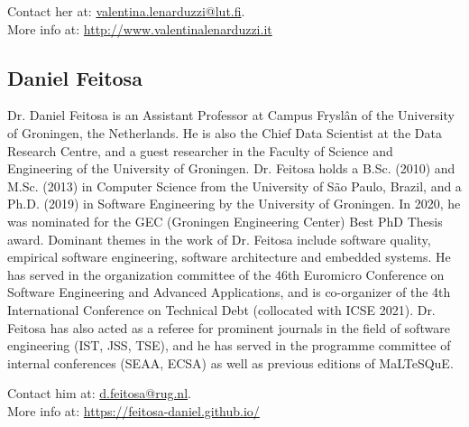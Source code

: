 \medskip
\noindent 
Contact her at: \href{mailto:valentina.lenarduzzi@lut.fi}{valentina.lenarduzzi@lut.fi}.\\
More info at: \url{http://www.valentinalenarduzzi.it}

\subsection{Daniel Feitosa}
Dr. Daniel Feitosa is an Assistant Professor at Campus Fryslân of the University of Groningen, the Netherlands. He is also the Chief Data Scientist at the Data Research Centre, and a guest researcher in the Faculty of Science and Engineering of the University of Groningen. 
Dr. Feitosa holds a B.Sc. (2010) and M.Sc. (2013) in Computer Science from the University of São Paulo, Brazil, and a Ph.D. (2019) in Software Engineering by the University of Groningen. In 2020, he was nominated for the GEC (Groningen Engineering Center) Best PhD Thesis award. Dominant themes in the work of Dr. Feitosa include software quality, empirical software engineering, software architecture and embedded systems.
He has served in the organization committee of the 46th Euromicro Conference on Software Engineering and Advanced Applications, and is co-organizer of the 4th International Conference on Technical Debt (collocated with ICSE 2021). Dr. Feitosa has also acted as a referee for prominent journals in the field of software engineering (IST, JSS, TSE), and he has served in the programme committee of internal conferences (SEAA, ECSA) as well as previous editions of MaLTeSQuE.

\medskip
\noindent Contact him at: \href{mailto:d.feitosa@rug.nl}{d.feitosa@rug.nl}.\\
More info at: \url{https://feitosa-daniel.github.io/}\\

